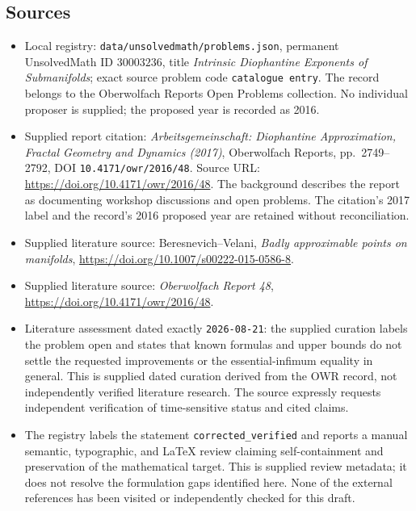 \documentclass[11pt]{article}
\begin{document}
\subsection{Sources}
\begin{itemize}
\item Local registry: \texttt{data/unsolvedmath/problems.json}, permanent UnsolvedMath ID \(30003236\), title \emph{Intrinsic Diophantine Exponents of Submanifolds}; exact source problem code \texttt{catalogue entry}. The record belongs to the Oberwolfach Reports Open Problems collection. No individual proposer is supplied; the proposed year is recorded as 2016.
\item Supplied report citation: \emph{Arbeitsgemeinschaft: Diophantine Approximation, Fractal Geometry and Dynamics (2017)}, Oberwolfach Reports, pp.\ 2749--2792, DOI \texttt{10.4171/owr/2016/48}. Source URL: \url{https://doi.org/10.4171/owr/2016/48}. The background describes the report as documenting workshop discussions and open problems. The citation's 2017 label and the record's 2016 proposed year are retained without reconciliation.
\item Supplied literature source: Beresnevich--Velani, \emph{Badly approximable points on manifolds}, \url{https://doi.org/10.1007/s00222-015-0586-8}.
\item Supplied literature source: \emph{Oberwolfach Report 48}, \url{https://doi.org/10.4171/owr/2016/48}.
\item Literature assessment dated exactly \texttt{2026-08-21}: the supplied curation labels the problem open and states that known formulas and upper bounds do not settle the requested improvements or the essential-infimum equality in general. This is supplied dated curation derived from the OWR record, not independently verified literature research. The source expressly requests independent verification of time-sensitive status and cited claims.
\item The registry labels the statement \texttt{corrected\_verified} and reports a manual semantic, typographic, and LaTeX review claiming self-containment and preservation of the mathematical target. This is supplied review metadata; it does not resolve the formulation gaps identified here. None of the external references has been visited or independently checked for this draft.
\end{itemize}
\end{document}
